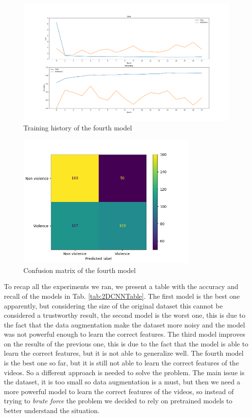 \begin{figure}[]
    \centering
    \includegraphics[width=1\textwidth]{images/731a-medium7Dropout4-b538-history.png}
    \caption{Training history of the fourth model}
    \label{fig:Final2DCNNHistory}
\end{figure}
\begin{figure}[]
    \centering
    \includegraphics[width=0.8\textwidth]{images/731a-medium7Dropout4-b538-conf_matrix.png}
    \caption{Confusion matrix of the fourth model}
    \label{fig:Final2DCNNMatrix}
\end{figure}

To recap all the experiments we ran, we present a table with the accuracy and recall of the models in Tab. \ref{tab:2DCNNTable}. The first model is the best one apparently, but considering the size of the original dataset this cannot be considered a trustworthy result, the second model is the worst one, this is due to the fact that the data augmentation make the dataset more noisy and the model was not powerful enough to learn the correct features. The third model improves on the results of the previous one, this is due to the fact that the model is able to learn the correct features, but it is not able to generalize well. The fourth model is the best one so far, but it is still not able to learn the correct features of the videos. So a different approach is needed to solve the problem. The main issue is the dataset, it is too small so data augmentation is a must, but then we need a more powerful model to learn the correct features of the videos, so instead of trying to \textit{brute force} the problem we decided to rely on pretrained models to better understand the situation.

